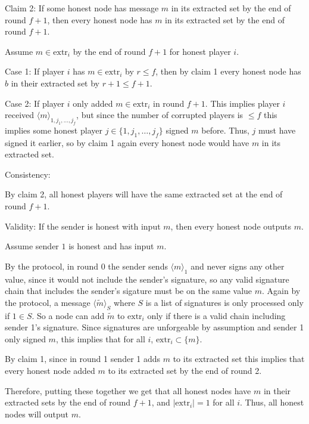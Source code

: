 \documentclass[12pt, letterpaper]{article}
\begin{document}
\begin{problemproof}
    Claim 2: If some honest node has message $m$ in its extracted set by the end of round $f+1$, then every
    honest node has $m$ in its extracted set by the end of round $f+1$.

    Assume $m \in \mathrm{extr}_i$ by the end of round $f+1$ for honest player $i$.

    Case 1: If player $i$ has $m \in \mathrm{extr}_i$ by $r \leq f$, then by claim 1 every honest node has $b$ in their extracted set by $r+1 \leq f+1$.

    Case 2: If player $i$ only added $m \in \mathrm{extr}_i$ in round $f+1$. This implies player $i$ received $\langle m \rangle_{1,j_1,\dots,j_f}$, but since the number of corrupted players is $\leq f$ this implies some honest player $j \in \{1,j_1,\dots,j_f\}$ signed $m$ before.
    Thus, $j$ must have signed it earlier, so by claim 1 again every honest node would have $m$ in its extracted set.

    Consistency:

    By claim 2, all honest players will have the same extracted set at the end of round $f+1$.

    Validity: If the sender is honest with input $m$, then every honest node outputs $m$.

    Assume sender $1$ is honest and has input $m$.

    By the protocol, in round 0 the sender sends $\langle m \rangle_{1}$ and never signs any other value, since it would not include the sender's signature, so any valid signature chain that includes the sender's sigature must be on the same value $m$.
    Again by the protocol, a message $\langle \tilde{m} \rangle_{S}$ where $S$ is a list of signatures is only processed only if $1 \in S$. So a node can add $\tilde{m}$ to $\mathrm{extr}_i$ only if there is a valid chain including sender 1's signature.
    Since signatures are unforgeable by assumption and sender 1 only signed $m$, this implies that for all $i$, $\mathrm{extr}_i \subset \{m\}$.

    By claim 1, since in round 1 sender 1 adds $m$ to its extracted set this implies that every honest node added $m$ to its extracted set by the end of round 2.

    Therefore, putting these together we get that all honest nodes have $m$ in their extracted sets by the end of round $f+1$, and $| \mathrm{extr}_i| = 1$ for all $i$. Thus, all honest nodes will output $m$.
\end{problemproof}
\end{document}
